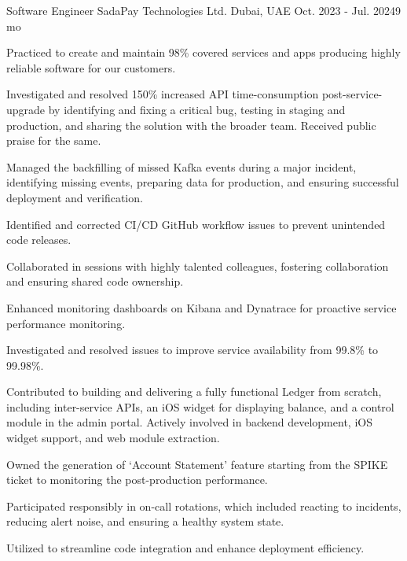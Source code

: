 

\begin{cventries}

  \cventry
  {Software Engineer} %
  {SadaPay Technologies Ltd.} %
  {Dubai, UAE} %
  {Oct. 2023 - Jul. 2024{\enskip\cdotp\enskip}9 mo} %
  {
    \begin{cvitems} %
      \item {Practiced  to create and maintain 98\% covered services and apps producing highly reliable software for our customers.}
      \item {Investigated and resolved 150\% increased API time-consumption post-service-upgrade by identifying and fixing a critical bug, testing in staging and production, and sharing the solution with the broader team. Received public praise for the same.}
      \item {Managed the backfilling of missed Kafka events during a major incident, identifying missing events, preparing data for production, and ensuring successful deployment and verification.}
      \item {Identified and corrected CI/CD GitHub workflow issues to prevent unintended code releases.}
      \item {Collaborated in  sessions with highly talented colleagues, fostering collaboration and ensuring shared code ownership.}
      \item {Enhanced monitoring dashboards on Kibana and Dynatrace for proactive service performance monitoring.}
      \item {Investigated and resolved issues to improve service availability from 99.8\% to 99.98\%.}
      \item {Contributed to building and delivering a fully functional Ledger from scratch, including inter-service APIs, an iOS widget for displaying balance, and a control module in the admin portal. Actively involved in backend development, iOS widget support, and web module extraction.}
      \item {Owned the generation of `Account Statement' feature starting from the SPIKE ticket to monitoring the post-production performance.}
      \item {Participated responsibly in on-call rotations, which included reacting to incidents, reducing alert noise, and ensuring a healthy system state.}
      \item {Utilized  to streamline code integration and enhance deployment efficiency.}
    \end{cvitems}
  }
      

\end{cventries}
